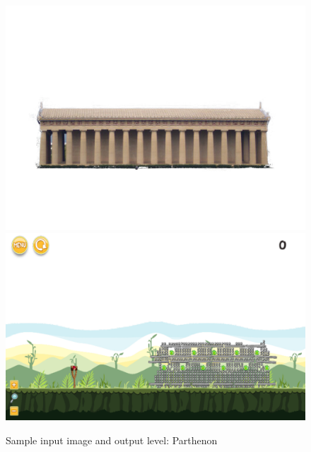 \documentclass{dalthesis}
\begin{document}
\begin{figure}
	\caption{Sample input image and output level: Parthenon}
  \includegraphics[width=\textwidth,height=\textheight,keepaspectratio]{levels/pictures/buildings/parthenon.jpg}
  \includegraphics[width=\textwidth,height=\textheight,keepaspectratio]{levels/screenshots/buildings/parthenon.png}
\end{figure}
\end{document}
